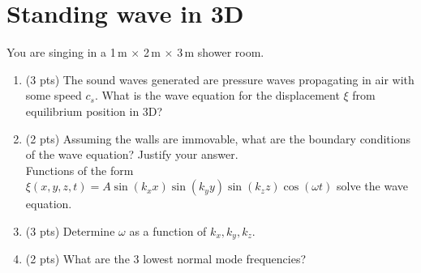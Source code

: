 \section{Standing wave in 3D}

You are singing in a 1\,m $\times$ 2\,m $\times$ 3\,m shower room.\\
\begin{enumerate}[label=\alph*)] %

\item (3 pts) The sound waves generated are pressure waves propagating in air with some speed $c_s$. What is the wave equation for the displacement $\xi$ from equilibrium position in 3D?


\item (2 pts) Assuming the walls are immovable, what are the boundary conditions of the wave equation? Justify your answer.
\\


Functions of the form $\xi(x,y,z,t)=A\sin(k_x x)\sin(k_y y)\sin(k_z z)\cos(\omega t)$ solve the wave equation.


\item (3 pts) Determine $\omega$ as a function of $k_x, k_y, k_z$.

\item (2 pts) What are the 3 lowest normal mode frequencies?

\end{enumerate}

%
%
%
%
%
%
%
%
%
%
%
